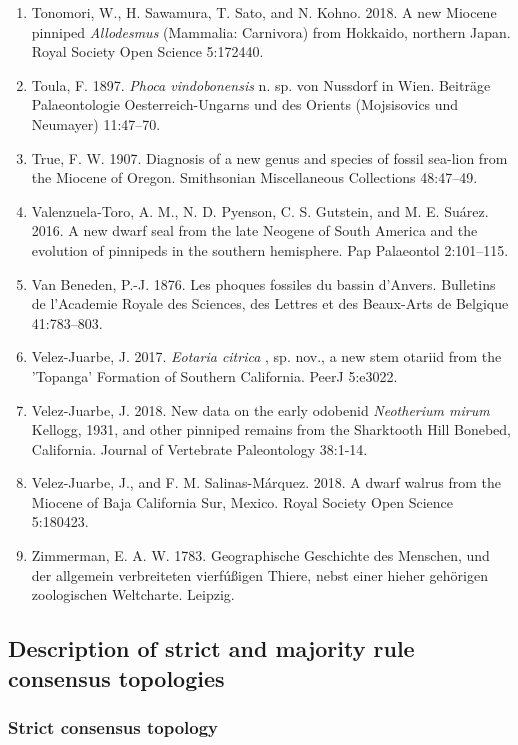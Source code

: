 \documentclass[a4paper, 12pt]{article}
\begin{document}
\begin{enumerate}
\item Tonomori, W., H. Sawamura, T. Sato, and N. Kohno. 2018. A new Miocene pinniped \textit{Allodesmus} (Mammalia: Carnivora) from Hokkaido, northern Japan. Royal Society Open Science 5:172440.
\item Toula, F. 1897. \textit{Phoca vindobonensis} n. sp. von Nussdorf in Wien. Beiträge Palaeontologie Oesterreich-Ungarns und des Orients (Mojsisovics und Neumayer) 11:47–70.
\item True, F. W. 1907. Diagnosis of a new genus and species of fossil sea-lion from the Miocene of Oregon. Smithsonian Miscellaneous Collections 48:47–49.
\item Valenzuela-Toro, A. M., N. D. Pyenson, C. S. Gutstein, and M. E. Suárez. 2016. A new dwarf seal from the late Neogene of South America and the evolution of pinnipeds in the southern hemisphere. Pap Palaeontol 2:101–115.
\item Van Beneden, P.-J. 1876. Les phoques fossiles du bassin d'Anvers. Bulletins de l'Academie Royale des Sciences, des Lettres et des Beaux-Arts de Belgique 41:783–803.
\item Velez-Juarbe, J. 2017. \textit{Eotaria citrica} , sp. nov., a new stem otariid from the 'Topanga' Formation of Southern California. PeerJ 5:e3022.
\item Velez-Juarbe, J. 2018. New data on the early odobenid \textit{Neotherium mirum} Kellogg, 1931, and other pinniped remains from the Sharktooth Hill Bonebed, California. Journal of Vertebrate Paleontology 38:1-14.
\item Velez-Juarbe, J., and F. M. Salinas-M\'{a}rquez. 2018. A dwarf walrus from the Miocene of Baja California Sur, Mexico. Royal Society Open Science 5:180423.
\item Zimmerman, E. A. W. 1783. Geographische Geschichte des Menschen, und der allgemein verbreiteten vierf\'{u}{\ss}igen Thiere, nebst einer hieher geh\"{o}rigen zoologischen Weltcharte. Leipzig.
\end{enumerate}

\subsection{Description of strict and majority rule consensus topologies}

\subsubsection{Strict consensus topology}
\end{document}
